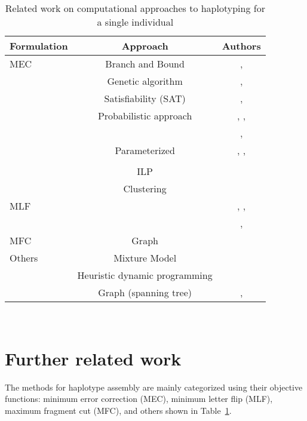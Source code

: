 \begin{center}
\begin{table}
\centering
\begin{tabular}{ |l|c|c| } 
 \hline
Formulation &  Approach  & Authors \\ 
  \hline
 MEC & Branch and Bound & \cite{wang2005haplotype}, \cite{lim2012individual}\\
   & Genetic algorithm& \cite{wang2005haplotype}, \cite{wang2012using}\\
   & Satisfiability (SAT) & \cite{mousavi2011effective}, \cite{he2010optimal} \\
   & Probabilistic approach & \cite{chen2008linear}, \cite{bansal2008mcmc}, \\
   & & \cite{Bansal2008}, \cite{Kuleshov2014b} \\
   & Parameterized & \cite{deng2013highly}, \cite{Pirola2015}, \\
   & & \cite{Patterson2015}\\
   & ILP & \cite{CDW13_exact} \\
   & Clustering & \cite{wang2007clustering} \\
   \hline
   MLF &  & \cite{zhao2005haplotype}, \cite{xie2008model}, \\
   & & \cite{kang2010hapassembler}, \cite{wu2013heuristic}\\
   \hline
   MFC & Graph & \cite{Duitama2010} \\
   \hline
   Others & Mixture Model & \cite{matsumoto2013mixsih} \\
    & Heuristic dynamic programming & \cite{xie2012fast} \\
    & Graph (spanning tree) & \cite{aguiar2012hapcompass}, \cite{mazrouee2014fasthap} \\
 \hline
\end{tabular}
\\[10pt]
 \caption{ Related work on computational approaches to haplotyping for a single individual}
\label{tab:related_work}
\end{table}
\end{center}
\section{Further related work}
The methods for haplotype assembly are mainly categorized using their objective functions: minimum error correction (MEC), minimum letter flip (MLF), maximum fragment cut (MFC), and others shown in Table~\ref{tab:related_work}.

